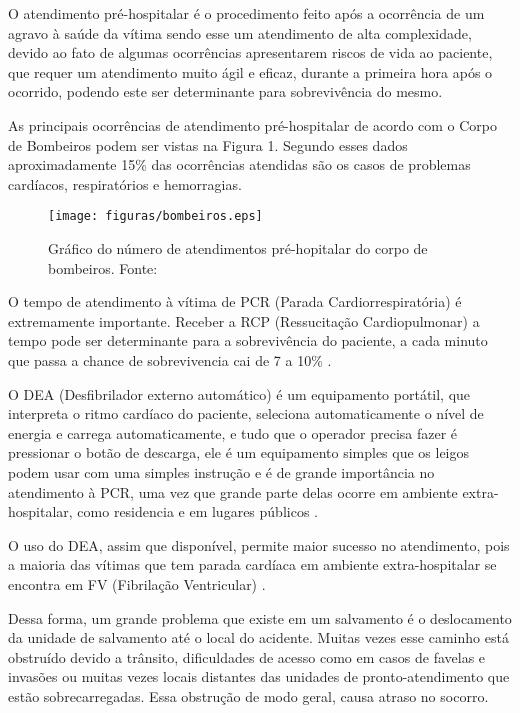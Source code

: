 O atendimento pré-hospitalar é o procedimento feito após a ocorrência de um agravo à saúde da vítima \cite{SBC} sendo esse um atendimento de alta complexidade, 
devido ao fato de algumas ocorrências apresentarem riscos de vida ao paciente, que requer um atendimento muito ágil e eficaz, durante a primeira hora após o ocorrido, 
podendo este ser determinante para sobrevivência do mesmo.\cite{PQA} 

As principais ocorrências de atendimento pré-hospitalar de acordo com o Corpo de Bombeiros podem ser vistas na Figura 1. Segundo esses dados aproximadamente 15\% das ocorrências atendidas são os casos de problemas cardíacos, respiratórios e hemorragias.

 \begin{figure}[H]
	\centering
		\texttt{[image: figuras/bombeiros.eps]}
	\caption[Gráfico do número de atendimentos pré-hopitalar do corpo de bombeiros]{Gráfico do número de atendimentos pré-hopitalar do corpo de bombeiros. Fonte: \cite{bombeiro}}
\end{figure}

O tempo de atendimento à vítima de PCR (Parada Cardiorrespiratória) é extremamente importante. Receber a RCP (Ressucitação Cardiopulmonar) a tempo pode ser determinante para a sobrevivência do paciente, a cada minuto que passa a chance de sobrevivencia cai de 7 a 10\% \cite{SBC}. 

O DEA (Desfibrilador externo automático) é um equipamento portátil, que interpreta o ritmo cardíaco do paciente, seleciona automaticamente o nível de energia e carrega automaticamente, e tudo que o operador precisa fazer é pressionar o botão de descarga, ele é um equipamento simples que os leigos podem usar com uma simples instrução e é de grande importância no atendimento à PCR, uma vez que grande parte delas ocorre em ambiente extra-hospitalar, como residencia e em lugares públicos \cite{SBC}.

O uso do DEA, assim que disponível, permite maior sucesso no atendimento, pois a maioria das vítimas que tem parada cardíaca em ambiente extra-hospitalar se encontra em FV (Fibrilação Ventricular) \cite{SBC}.

Dessa forma, um grande  problema  que existe em um salvamento é o deslocamento da unidade de salvamento até o local do acidente. Muitas vezes esse caminho está obstruído devido a trânsito, dificuldades de acesso como em casos de favelas e invasões ou muitas vezes locais distantes das unidades de pronto-atendimento que estão sobrecarregadas. Essa obstrução de modo geral, causa atraso no socorro.

